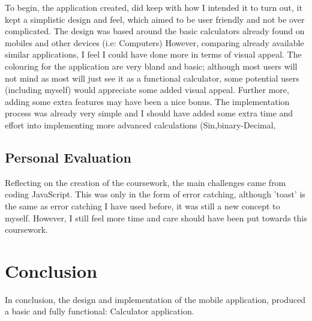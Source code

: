 \documentclass[10pt, a4paper]{article}
\begin{document}
	To begin, the application created, did keep with how I intended it to turn out, it kept a simplistic design and feel, which aimed to be user friendly and
	not be over complicated.
	The design was based around the basic calculators already found on mobiles and other devices (i.e: Computers)
	However, comparing already available similar applications, I feel I could have done more in terms of visual appeal.
	The colouring for the application are very bland and basic; although most users will not mind as most will just see it as a functional calculator, some 
	potential users (including myself) would appreciate some added visual appeal.
	Further more, adding some extra features may have been a nice bonus. The implementation process was already very simple and I should have added some extra time and effort
	into implementing more advanced calculations (Sin,binary-Decimal,%
	
	\subsection{Personal Evaluation}
	Reflecting on the creation of the coursework, the main challenges came from coding JavaScript. 
	This was only in the form of error catching, although 'toast' is the same as error catching I have used before, it was still a new concept to myself.
	However, I still feel more time and care should have been put towards this coursework.

	
	\section{Conclusion}
	In conclusion, the design and implementation of the mobile application, produced a basic and fully functional: Calculator application.


		
\end{document}
